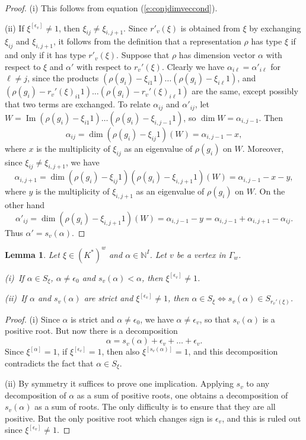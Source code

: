 \documentclass{amsart}
\theoremstyle{plain}
\newtheorem{lem}[thm]{Lemma}
\theoremstyle{definition}
\theoremstyle{remark}
\newcommand{\N}{\mathbb{N}}
\DeclareMathOperator{\Ima}{Im}
\begin{document}
\begin{proof}
(i) This follows from equation (\ref{e:conjdimveccond}).

(ii) If $\xi^{[\epsilon_v]}\neq 1$, then $\xi_{ij}\neq \xi_{i,j+1}$.
Since $r'_v(\xi)$ is obtained from $\xi$ by exchanging $\xi_{ij}$ and $\xi_{i,j+1}$,
it follows from the definition that a representation $\rho$ has type $\xi$
if and only if it has type $r'_v(\xi)$.
Suppose that $\rho$ has dimension vector $\alpha$ with respect to $\xi$ and $\alpha'$ with
respect to $r_v'(\xi)$. Clearly we have $\alpha_{i\ell} = \alpha'_{i\ell}$ for $\ell\neq j$,
since the products $(\rho(g_i) - \xi_{i1}1)\dots (\rho(g_i) - \xi_{i\ell}1)$,
and $(\rho(g_i) - r_v'(\xi)_{i1}1)\dots (\rho(g_i) - r_v'(\xi)_{i\ell}1)$
are the same, except possibly that two terms are exchanged.
To relate $\alpha_{ij}$ and $\alpha'_{ij}$, let
$W = \Ima (\rho(g_i) - \xi_{i1}1)\dots (\rho(g_i) - \xi_{i,j-1}1)$,
so $\dim W = \alpha_{i,j-1}$.
Then
\[
\alpha_{ij} = \dim (\rho(g_i) - \xi_{ij}1)(W) = \alpha_{i,j-1} - x,
\]
where $x$ is the multiplicity of $\xi_{ij}$ as an eigenvalue of $\rho(g_i)$ on $W$.
Moreover, since $\xi_{ij}\neq \xi_{i,j+1}$, we have
\[
\alpha_{i,j+1} = \dim (\rho(g_i) - \xi_{ij}1)(\rho(g_i) - \xi_{i,j+1}1)(W) = \alpha_{i,j-1} - x- y,
\]
where $y$ is the multiplicity of $\xi_{i,j+1}$ as an eigenvalue of $\rho(g_i)$ on $W$.
On the other hand
\[
\alpha'_{ij} = \dim (\rho(g_i) - \xi_{i,j+1}1)(W) = \alpha_{i,j-1} - y
= \alpha_{i,j-1} + \alpha_{i,j+1} - \alpha_{ij}.
\]
Thus $\alpha' = s_v(\alpha)$.
\end{proof}


\begin{lem}\label{l:reflS}
Let $\xi\in(K^*)^w$ and $\alpha\in \N^I$.
Let $v$ be a vertex in $\Gamma_w$.

\textup{\hphantom{i}(i)}~If $\alpha\in S_\xi$, $\alpha\neq \epsilon_0$ and $s_v(\alpha) < \alpha$, then $\xi^{[\epsilon_v]} \neq 1$.

\textup{(ii)}~If $\alpha$ and $s_v(\alpha)$ are strict and $\xi^{[\epsilon_v]} \neq 1$,
then $\alpha\in S_\xi\Leftrightarrow s_v(\alpha)\in S_{r_v'(\xi)}$.
\end{lem}


\begin{proof}
(i) Since $\alpha$ is strict and $\alpha\neq \epsilon_0$, we have $\alpha\neq \epsilon_v$,
so that $s_v(\alpha)$ is a positive root.
But now there is a decomposition
\[
\alpha = s_v(\alpha) + \epsilon_v + \dots + \epsilon_v.
\]
Since $\xi^{[\alpha]}=1$, if $\xi^{[\epsilon_v]}=1$, then also $\xi^{[s_v(\alpha)]}=1$,
and this decomposition contradicts the fact that $\alpha\in S_\xi$.

(ii) By symmetry it suffices to prove one implication. Applying $s_v$ to any decomposition
of $\alpha$ as a sum of positive roots, one obtains a decomposition of $s_v(\alpha)$ as
a sum of roots. The only difficulty is to ensure that they are all positive. But the
only positive root which changes sign is $\epsilon_v$, and this is ruled out since $\xi^{[\epsilon_v]}\neq 1$.
\end{proof}
\end{document}
